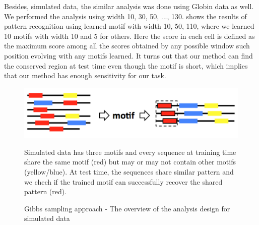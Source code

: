 \documentclass[11pt, oneside]{article}
\begin{document}
Besides, simulated data, the similar analysis was done using Globin data as well. We performed the analysis using width 10, 30, 50, ..., 130.  shows the results of pattern recognition using learned motif with width 10, 50, 110, where we learned 10 motifs with width 10 and 5 for others. Here the score in each cell is defined as the maximum score among all the scores obtained by any possible window such position evolving with any motifs learned. It turns out that our method can find the conserved region at test time even though the motif is short, which implies that our method has enough sensitivity for our task.
\begin{figure}
  \centering
  \begin{minipage}{0.8\textwidth} %
  \includegraphics[width=\textwidth]{images/chart}
  {\footnotesize Simulated data has three motifs and every sequence at training time share the same motif (red) but may or may not contain other motifs (yellow/blue). At test time, the sequences share similar pattern and we chech if the trained motif can successfully recover the shared pattern (red).\par}
  \end{minipage}
  \caption{Gibbs sampling approach - The overview of the analysis design for simulated data}
  \label{fig:design}
\end{figure}
\end{document}
